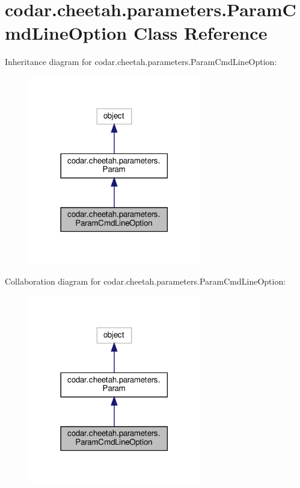 \hypertarget{classcodar_1_1cheetah_1_1parameters_1_1_param_cmd_line_option}{}\section{codar.\+cheetah.\+parameters.\+Param\+Cmd\+Line\+Option Class Reference}
\label{classcodar_1_1cheetah_1_1parameters_1_1_param_cmd_line_option}


Inheritance diagram for codar.\+cheetah.\+parameters.\+Param\+Cmd\+Line\+Option\+:
\nopagebreak
\begin{figure}[H]
\begin{center}
\leavevmode
\includegraphics[width=213pt]{classcodar_1_1cheetah_1_1parameters_1_1_param_cmd_line_option__inherit__graph}
\end{center}
\end{figure}


Collaboration diagram for codar.\+cheetah.\+parameters.\+Param\+Cmd\+Line\+Option\+:
\nopagebreak
\begin{figure}[H]
\begin{center}
\leavevmode
\includegraphics[width=213pt]{classcodar_1_1cheetah_1_1parameters_1_1_param_cmd_line_option__coll__graph}
\end{center}
\end{figure}
